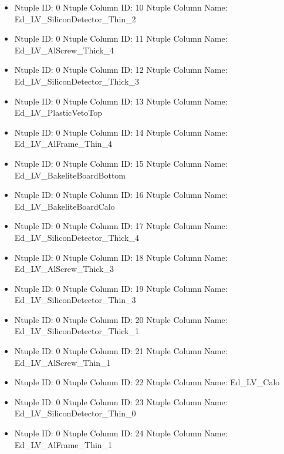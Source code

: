 \documentclass[8pt]{beamer}
\begin{document}
\begin{frame}
\begin{itemize}
        \item Ntuple ID: 0 Ntuple Column ID: 10 Ntuple Column Name: Ed\_LV\_SiliconDetector\_Thin\_2
        
        \item Ntuple ID: 0 Ntuple Column ID: 11 Ntuple Column Name: Ed\_LV\_AlScrew\_Thick\_4
        
        \item Ntuple ID: 0 Ntuple Column ID: 12 Ntuple Column Name: Ed\_LV\_SiliconDetector\_Thick\_3
        
        \item Ntuple ID: 0 Ntuple Column ID: 13 Ntuple Column Name: Ed\_LV\_PlasticVetoTop
        
        \item Ntuple ID: 0 Ntuple Column ID: 14 Ntuple Column Name: Ed\_LV\_AlFrame\_Thin\_4
        
        \item Ntuple ID: 0 Ntuple Column ID: 15 Ntuple Column Name: Ed\_LV\_BakeliteBoardBottom
        
        \item Ntuple ID: 0 Ntuple Column ID: 16 Ntuple Column Name: Ed\_LV\_BakeliteBoardCalo
        
        \item Ntuple ID: 0 Ntuple Column ID: 17 Ntuple Column Name: Ed\_LV\_SiliconDetector\_Thick\_4
        
        \item Ntuple ID: 0 Ntuple Column ID: 18 Ntuple Column Name: Ed\_LV\_AlScrew\_Thick\_3
        
        \item Ntuple ID: 0 Ntuple Column ID: 19 Ntuple Column Name: Ed\_LV\_SiliconDetector\_Thin\_3
        
        \item Ntuple ID: 0 Ntuple Column ID: 20 Ntuple Column Name: Ed\_LV\_SiliconDetector\_Thick\_1
        
        \item Ntuple ID: 0 Ntuple Column ID: 21 Ntuple Column Name: Ed\_LV\_AlScrew\_Thin\_1
        
        \item Ntuple ID: 0 Ntuple Column ID: 22 Ntuple Column Name: Ed\_LV\_Calo
        
        \item Ntuple ID: 0 Ntuple Column ID: 23 Ntuple Column Name: Ed\_LV\_SiliconDetector\_Thin\_0
        
        \item Ntuple ID: 0 Ntuple Column ID: 24 Ntuple Column Name: Ed\_LV\_AlFrame\_Thin\_1
        

\end{itemize}
\end{frame}
\end{document}
